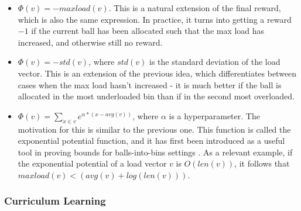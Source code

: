 \begin{itemize}
    \item
    $\Phi(v)=-maxload(v)$. This is a natural extension of the final reward, which is also the same expression. In practice, it turns into getting a reward $-1$ if the current ball has been allocated such that the max load has increased, and otherwise still no reward.
    \item
    $\Phi(v)=-std(v)$, where $std(v)$ is the standard deviation of the load vector. This is an extension of the previous idea, which differentiates between cases when the max load hasn't increased - it is much better if the ball is allocated in the most underloaded bin than if in the second most overloaded.
    \item
    $\Phi(v)=\sum_{x\in v} e^{\alpha * (x - avg(v))}$, where $\alpha$ is a hyperparameter. The motivation for this is similar to the previous one. This function is called the exponential potential function, and it has first been introduced as a useful tool in proving bounds for balls-into-bins settings \cite{ghosh1999exponentialpotential} . As a relevant example, if the exponential potential of a load vector $v$ is $O(len(v))$, it follows that $maxload(v) < (avg(v)+log(len(v)))$.
\end{itemize}


\subsubsection{Curriculum Learning}



